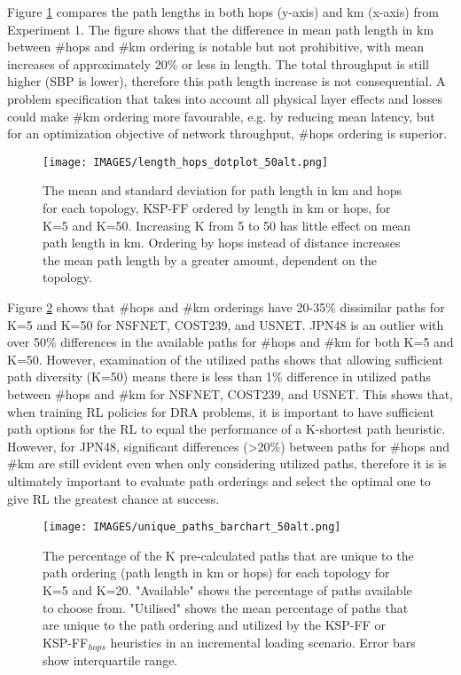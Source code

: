 Figure \ref{fig:length_hops_dotplot} compares the path lengths in both hops (y-axis) and km (x-axis) from Experiment 1. The figure shows that the difference in mean path length in km between \#hops and \#km ordering is notable but not prohibitive, with mean increases of approximately 20\% or less in length. The total throughput is still higher (SBP is lower), therefore this path length increase is not consequential. A problem specification that takes into account all physical layer effects and losses could make \#km ordering more favourable, e.g. by reducing mean latency, but for an optimization objective of network throughput, \#hops ordering is superior.

\begin{figure}[h]
    \centering
    \texttt{[image: IMAGES/length\_hops\_dotplot\_50alt.png]}
    \caption{The mean and standard deviation for path length in km and hops for each topology, KSP-FF ordered by length in km or hops, for K=5 and K=50. Increasing K from 5 to 50 has little effect on mean path length in km. Ordering by hops instead of distance increases the mean path length by a greater amount, dependent on the topology.}
    \label{fig:length_hops_dotplot}
\end{figure}

Figure \ref{fig:unique_paths_barchart} shows that \#hops and \#km orderings have 20-35\% dissimilar paths for K=5 and K=50 for NSFNET, COST239, and USNET. JPN48 is an outlier with over 50\% differences in the available paths for \#hops and \#km for both K=5 and K=50. However, examination of the utilized paths shows that allowing sufficient path diversity (K=50) means there is less than 1\% difference in utilized paths between \#hops and \#km for NSFNET, COST239, and USNET. This shows that, when training RL policies for DRA problems, it is important to have sufficient path options for the RL to equal the performance of a K-shortest path heuristic. However, for JPN48, significant differences (>20\%) between paths for \#hops and \#km are still evident even when only considering utilized paths, therefore it is is ultimately important to evaluate path orderings and select the optimal one to give RL the greatest chance at success.


\begin{figure}[h]
    \centering
    \texttt{[image: IMAGES/unique\_paths\_barchart\_50alt.png]}
    \caption{The percentage of the K pre-calculated paths that are unique to the path ordering (path length in km or hops) for each topology for K=5 and K=20. "Available" shows the percentage of paths available to choose from. "Utilised" shows the mean percentage of paths that are unique to the path ordering and utilized by the KSP-FF or KSP-FF$_{hops}$ heuristics in an incremental loading scenario. Error bars show interquartile range.}
    \label{fig:unique_paths_barchart}
\end{figure}
